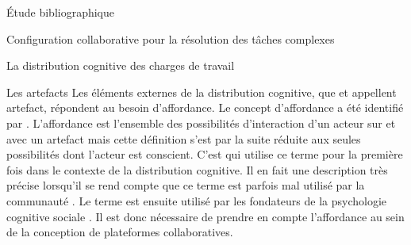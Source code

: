 \documentclass[myfrancais,ngerman,english,french]{mythesis}
\begin{document}
\begin{mychapter}{Étude bibliographique}
\begin{mysection}{Configuration collaborative pour la résolution des tâches complexes}
\begin{mysubsection}{La distribution cognitive des charges de travail}
				\begin{mysubsubsection}{Les artefacts}
					Les éléments externes de la distribution cognitive, que  et  appellent artefact, répondent au besoin d'affordance.
					Le concept d'affordance a été identifié par .
					L'affordance est l'ensemble des possibilités d'interaction d'un acteur sur et avec un artefact  mais cette définition s'est par la suite réduite aux seules possibilités dont l'acteur est conscient.
					C'est  qui utilise ce terme pour la première fois dans le contexte de la distribution cognitive.
					Il en fait une description très précise lorsqu'il se rend compte que ce terme est parfois mal utilisé par la communauté .
					Le terme est ensuite utilisé par les fondateurs de la psychologie cognitive sociale .
					Il est donc nécessaire de prendre en compte l'affordance au sein de la conception de plateformes collaboratives.


\end{mysubsubsection}
\end{mysubsection}
\end{mysection}
\end{mychapter}
\end{document}
